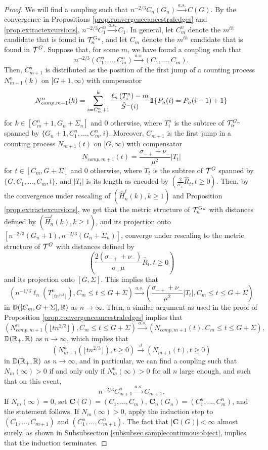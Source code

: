 \begin{proof}
We will find a coupling such that $n^{-2/3}C_n(G_n)\overset{a.s.}{\to}C(G).$ By the convergence in Propositions \ref{prop.convergenceancestraledges} and \ref{prop.extractexcursions}, $n^{-2/3}C_1^n\overset{a.s.}{\to}C_1$. In general, let $C_m^n$ denote the $m^{th}$ candidate that is found in ${\mathcal T}^{G_n}_n$, and let $C_m$ denote the $m^{th}$ candidate that is found in ${\mathcal T}^{G}$. Suppose that, for some $m$, we have found a coupling such that 
$$n^{-2/3}(C_1^n,\dots,C_m^n)\overset{a.s.}{\to}(C_1,\dots,C_m).$$
Then, $C_{m+1}^n$ is distributed as the position of the first jump of a counting process $N^n_{m+1}(k)$ on $[G+1,\infty)$ with compensator 
$$N^n_{comp,m+1}(k)=\sum_{i=C_m^n+1}^k \frac{\ell_n\left(T^n_{i}\right)-m}{\hat{S}^-(i)}  \one{\left\{P_n(i)=P_n(i-1)+1\right\}}$$
for $k\in [C_m^n+1,G_n+\Sigma_n]$ and $0$ otherwise, where $T^n_i$ is the subtree of ${\mathcal T}^{G_n}_n$ spanned by $\{G_n+1,C^n_1,\dots,C^n_m,i\}$. 
Moreover, $C_{m+1}$ is the first jump in a counting process $N_{m+1}(t)$ on $[G,\infty)$ with compensator 
$$N_{comp,m+1}(t)= \frac{\sigma_{-+}+\nu_-}{\mu^2}|T_t|$$
for $t\in [C_m,G+\Sigma]$ and $0$ otherwise, where $T_t$ is the subtree of ${\mathcal T}^{G}$ spanned by $\{G,C_1,\dots,C_m, t\}$, and $|T_t|$ is its length as encoded by $\left(\frac{2}{\sigma_+}\hat{R}_t,t\geq 0\right)$. Then, by the convergence under rescaling of $(\hat{H}^\ell_n(k),k\geq 1)$ and Proposition \ref{prop.extractexcursions}, we get that the metric structure of ${\mathcal T}^{G_n}_n$ with distances defined by $(\hat{H}^\ell_n(k),k\geq 1)$, and its projection onto $[n^{-2/3}(G_n+1),n^{-2/3}(G_n+\Sigma_n)]$, converge under rescaling to the metric structure of ${\mathcal T}^{G}$ with distances defined by $$\left(\frac{2(\sigma_{-+}+\nu_-)}{\sigma_+\mu}\hat{R}_t,t\geq 0\right)$$ and its projection onto $[G,\Sigma]$. This implies that 
$$\left(n^{-1/3}\ell_n\left(T^n_{\lfloor t n^{2/3}\rfloor}\right),C_m\leq t \leq G+\Sigma\right)\overset{a.s.}{\to} \left(\frac{\sigma_{-+}+\nu_-}{\mu^2}|T_t|, C_m\leq t \leq G+\Sigma\right)$$ in ${\mathbb D}([C_m,G+\Sigma],{\mathbb R})$ as $n\to \infty$. Then, a similar argument as used in the proof of Proposition \ref{prop.convergenceancestraledges} implies that 
$$\left(N^n_{comp,m+1}\left(\lfloor t n^{2/3}\rfloor \right),C_m\leq t \leq G+\Sigma\right)\overset{a.s.}{\to}\left(N_{comp,m+1}(t),C_m\leq t \leq G+\Sigma\right),$$
${\mathbb D}({\mathbb R}_+,{\mathbb R})$ as $n\to\infty$, which implies that 
$$(N^n_{m+1}(\lfloor t n^{2/3} \rfloor ),t\geq 0)\overset{d}{\to} (N_{m+1}(t),t\geq 0)$$ in ${\mathbb D}({\mathbb R}_+,{\mathbb R})$ as $n\to\infty$, and in particular, we can find a coupling such that $N_m(\infty)>0$ if and only only if $N^n_m(\infty)>0$ for all $n$ large enough, and such that on this event,
$$n^{-2/3}C_{m+1}^n\overset{a.s.}{\to}C_{m+1}.$$
If $N_m(\infty)=0$, set $\mathbf{C}(G)=(C_1,\dots,C_m)$, $\mathbf{C}_n(G_n)=(C^n_1,\dots,C^n_m)$, and the statement follows. If $N_m(\infty)>0$, apply the induction step to $(C_1,\dots,C_{m+1})$ and $(C^n_1,\dots,C^n_{m+1})$. The fact that $|\mathbf{C}(G)|<\infty$ almost surely, as shown in Subsubsection \ref{subsubsec.samplecontinuousobject}, implies that the induction terminates.
\end{proof}

